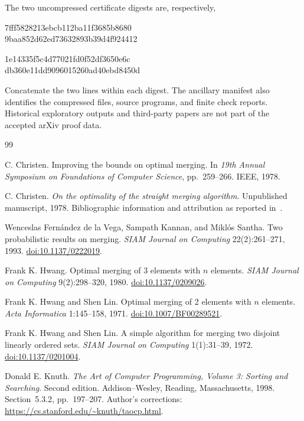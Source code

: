 \documentclass[11pt]{article}
\theoremstyle{definition}
\theoremstyle{remark}
\begin{document}
The two uncompressed certificate digests are, respectively,
\begin{center}\small\ttfamily
7fff5828213ebcb112ba11f3685b8680\\
9baa852d62ed73632893b39d4f924412\par\medskip
1e14335f5c4d77021fd0f52df3650e6c\\
db360e11dd9096015260ad40ebd8450d
\end{center}
Concatenate the two lines within each digest. The ancillary manifest
also identifies the compressed files, source programs, and finite
check reports. Historical exploratory outputs and third-party papers
are not part of the accepted arXiv proof data.


\begin{thebibliography}{99}

C. Christen.
Improving the bounds on optimal merging.
In \emph{19th Annual Symposium on Foundations of Computer Science},
pp.~259--266. IEEE, 1978.

C. Christen.
\emph{On the optimality of the straight merging algorithm}.
Unpublished manuscript, 1978. Bibliographic information and attribution
as reported in~\cite{lsz2016,lsz2020}.

Wenceslas Fern\'andez de la Vega, Sampath Kannan, and Mikl\'os Santha.
Two probabilistic results on merging.
\emph{SIAM Journal on Computing} 22(2):261--271, 1993.
\href{https://doi.org/10.1137/0222019}{doi:10.1137/0222019}.

Frank K. Hwang.
Optimal merging of 3 elements with $n$ elements.
\emph{SIAM Journal on Computing} 9(2):298--320, 1980.
\href{https://doi.org/10.1137/0209026}{doi:10.1137/0209026}.

Frank K. Hwang and Shen Lin.
Optimal merging of 2 elements with $n$ elements.
\emph{Acta Informatica} 1:145--158, 1971.
\href{https://doi.org/10.1007/BF00289521}{doi:10.1007/BF00289521}.

Frank K. Hwang and Shen Lin.
A simple algorithm for merging two disjoint linearly ordered sets.
\emph{SIAM Journal on Computing} 1(1):31--39, 1972.
\href{https://doi.org/10.1137/0201004}{doi:10.1137/0201004}.

Donald E. Knuth.
\emph{The Art of Computer Programming, Volume 3: Sorting and Searching}.
Second edition. Addison--Wesley, Reading, Massachusetts, 1998.
Section~5.3.2, pp.~197--207.
Author's corrections: \url{https://cs.stanford.edu/~knuth/taocp.html}.


\end{thebibliography}
\end{document}
